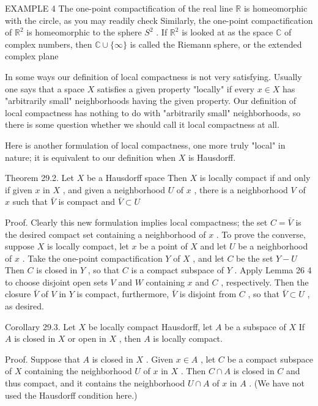 EXAMPLE 4 The one-point compactification of the real line \(\mathbb{R}\) is homeomorphic with the circle, as you may readily check Similarly, the one-point compactification of \({\mathbb{R}}^{2}\) is homeomorphic to the sphere \({S}^{2}\) . If \({\mathbb{R}}^{2}\) is looked at as the space \(\mathbb{C}\) of complex numbers, then \(\mathbb{C} \cup  \{ \infty \}\) is called the Riemann sphere, or the extended complex plane

In some ways our definition of local compactness is not very satisfying. Usually one says that a space \(X\) satisfies a given property "locally" if every \(x \in  X\) has "arbitrarily small" neighborhoods having the given property. Our definition of local compactness has nothing to do with "arbitrarily small" neighborhoods, so there is some question whether we should call it local compactness at all.

Here is another formulation of local compactness, one more truly "local" in nature; it is equivalent to our definition when \(X\) is Hausdorff.

Theorem 29.2. Let \(X\) be a Hausdorff space Then \(X\) is locally compact if and only if given \(x\) in \(X\) , and given a neighborhood \(U\) of \(x\) , there is a neighborhood \(V\) of \(x\) such that \(\bar{V}\) is compact and \(\bar{V} \subset  U\)

Proof. Clearly this new formulation implies local compactness; the set \(C = \bar{V}\) is the desired compact set containing a neighborhood of \(x\) . To prove the converse, suppose \(X\) is locally compact, let \(x\) be a point of \(X\) and let \(U\) be a neighborhood of \(x\) . Take the one-point compactification \(Y\) of \(X\) , and let \(C\) be the set \(Y - U\) Then \(C\) is closed in \(Y\) , so that \(C\) is a compact subspace of \(Y\) . Apply Lemma 26 4 to choose disjoint open sets \(V\) and \(W\) containing \(x\) and \(C\) , respectively. Then the closure \(\bar{V}\) of \(V\) in \(Y\) is compact, furthermore, \(\bar{V}\) is disjoint from \(C\) , so that \(\bar{V} \subset  U\) , as desired.

Corollary 29.3. Let \(X\) be locally compact Hausdorff, let \(A\) be a subspace of \(X\) If \(A\) is closed in \(X\) or open in \(X\) , then \(A\) is locally compact.

Proof. Suppose that \(A\) is closed in \(X\) . Given \(x \in  A\) , let \(C\) be a compact subspace of \(X\) containing the neighborhood \(U\) of \(x\) in \(X\) . Then \(C \cap  A\) is closed in \(C\) and thus compact, and it contains the neighborhood \(U \cap  A\) of \(x\) in \(A\) . (We have not used the Hausdorff condition here.)

